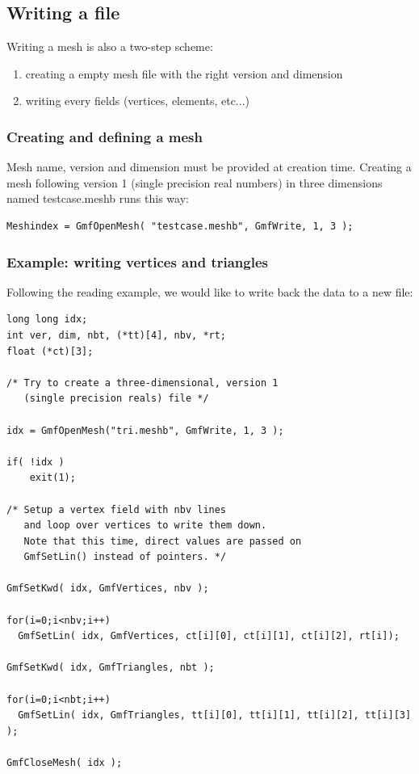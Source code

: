\documentclass[a4paper,12pt]{article}
\begin{document}
\subsection{Writing a file}

Writing a mesh is also a two-step scheme:

\begin{enumerate}
\item creating a empty mesh file with the right version and dimension
\item writing every fields (vertices, elements, etc...)
\end{enumerate}

\subsubsection{Creating and defining a mesh}

Mesh name, version and dimension must be provided at creation time. Creating a mesh following version 1 (single precision real numbers) in three dimensions named testcase.meshb runs this way:

\begin{tt}
\begin{verbatim}
Meshindex = GmfOpenMesh( "testcase.meshb", GmfWrite, 1, 3 );
\end{verbatim}
\end{tt}
\normalfont

\subsubsection{Example: writing vertices and triangles}

Following the reading example, we would like to write back the data to a new file:

\begin{tt}
\begin{verbatim}
long long idx;
int ver, dim, nbt, (*tt)[4], nbv, *rt;
float (*ct)[3];

/* Try to create a three-dimensional, version 1
   (single precision reals) file */

idx = GmfOpenMesh("tri.meshb", GmfWrite, 1, 3 );

if( !idx )
    exit(1);

/* Setup a vertex field with nbv lines
   and loop over vertices to write them down.
   Note that this time, direct values are passed on
   GmfSetLin() instead of pointers. */

GmfSetKwd( idx, GmfVertices, nbv );

for(i=0;i<nbv;i++)
  GmfSetLin( idx, GmfVertices, ct[i][0], ct[i][1], ct[i][2], rt[i]);

GmfSetKwd( idx, GmfTriangles, nbt );

for(i=0;i<nbt;i++)
  GmfSetLin( idx, GmfTriangles, tt[i][0], tt[i][1], tt[i][2], tt[i][3] );

GmfCloseMesh( idx );
\end{verbatim}
\end{tt}
\normalfont
\end{document}

